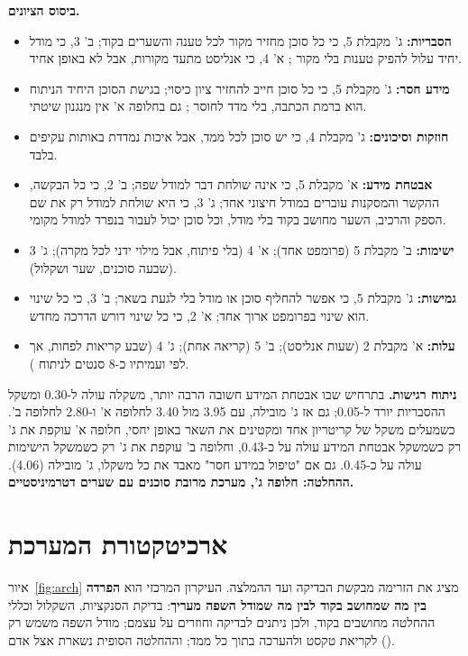 \textbf{ביסוס הציונים.}
\begin{itemize}
\item \textbf{הסבריות:} ג' מקבלת 5, כי כל סוכן מחזיר מקור לכל טענה והשערים בקוד; ב' 3, כי מודל יחיד עלול להפיק טענות בלי מקור \cite{huang2025}; א' 4, כי אנליסט מתעד מקורות, אבל לא באופן אחיד.
\item \textbf{מידע חסר:} ג' מקבלת 5, כי כל סוכן חייב להחזיר ציון כיסוי; בגישת הסוכן היחיד הניתוח הוא ברמת הכתבה, בלי מדד לחוסר \cite{zhao2025}; גם בחלופה א' אין מנגנון שיטתי.
\item \textbf{חוזקות וסיכונים:} ג' מקבלת 4, כי יש סוכן לכל ממד, אבל איכות נמדדת באותות עקיפים בלבד.
\item \textbf{אבטחת מידע:} א' מקבלת 5, כי אינה שולחת דבר למודל שפה; ב' 2, כי כל הבקשה, ההקשר והמסקנות עוברים במודל חיצוני אחד; ג' 3, כי היא שולחת למודל רק את שם הספק והרכיב, השער מחושב בקוד בלי מודל, וכל סוכן יכול לעבור בנפרד למודל מקומי.
\item \textbf{ישימות:} ב' מקבלת 5 (פרומפט אחד); א' 4 (בלי פיתוח, אבל מילוי ידני לכל מקרה); ג' 3 (שבעה סוכנים, שער ושקלול).
\item \textbf{גמישות:} ג' מקבלת 5, כי אפשר להחליף סוכן או מודל בלי לגעת בשאר; ב' 3, כי כל שינוי הוא שינוי בפרומפט ארוך אחד; א' 2, כי כל שינוי דורש הדרכה מחדש.
\item \textbf{עלות:} א' מקבלת 2 (שעות אנליסט); ב' 5 (קריאה אחת); ג' 4 (שבע קריאות לפחות, אך לפי  ועמיתיו כ-8 סנטים לניתוח \cite{almahri2026}).
\end{itemize}

\textbf{ניתוח רגישות.} בתרחיש שבו אבטחת המידע חשובה הרבה יותר, משקלה עולה ל-0.30 ומשקל ההסבריות יורד ל-0.05; גם אז ג' מובילה, עם 3.95 מול 3.40 לחלופה א' ו-2.80 לחלופה ב'. כשמעלים משקל של קריטריון אחד ומקטינים את השאר באופן יחסי, חלופה א' עוקפת את ג' רק כשמשקל אבטחת המידע עולה על כ-0.43, וחלופה ב' עוקפת את ג' רק כשמשקל הישימות עולה על כ-0.45. גם אם "טיפול במידע חסר" מאבד את כל משקלו, ג' מובילה (4.06). \textbf{ההחלטה: חלופה ג', מערכת מרובת סוכנים עם שערים דטרמיניסטיים.}

\section{ארכיטקטורת המערכת}\label{sec:architecture}

איור~\ref{fig:arch} מציג את הזרימה מבקשת הבדיקה ועד ההמלצה. העיקרון המרכזי הוא \textbf{הפרדה בין מה שמחושב בקוד לבין מה שמודל השפה מעריך}: בדיקת הסנקציות, השקלול וכללי ההחלטה מחושבים בקוד, ולכן ניתנים לבדיקה וחוזרים על עצמם; מודל השפה משמש רק לקריאת טקסט ולהערכה בתוך כל ממד; וההחלטה הסופית נשארת אצל אדם ().

